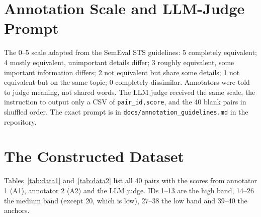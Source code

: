 \documentclass[11pt]{article}
\begin{document}
\begingroup
\makeatletter
\expandafter\def\expandafter\UrlBreaks\expandafter{\UrlBreaks\do\0\do\1\do\2\do\3\do\4\do\5\do\6\do\7\do\8\do\9}
\makeatother

\endgroup

\appendix
\section{Annotation Scale and LLM-Judge Prompt}
\label{sec:appendix}
The 0--5 scale adapted from the SemEval STS guidelines: 5 completely equivalent; 4 mostly equivalent, unimportant details differ; 3 roughly equivalent, some important information differs; 2 not equivalent but share some details; 1 not equivalent but on the same topic; 0 completely dissimilar. Annotators were told to judge meaning, not shared words. The LLM judge received the same scale, the instruction to output only a CSV of \texttt{pair\_id,score}, and the 40 blank pairs in shuffled order. The exact prompt is in \texttt{docs/annotation\_guidelines.md} in the repository.


\section{The Constructed Dataset}
\label{sec:appendixdata}
Tables~\ref{tab:data1} and~\ref{tab:data2} list all 40 pairs with the scores from annotator 1 (A1), annotator 2 (A2) and the LLM judge. IDs 1--13 are the high band, 14--26 the medium band (except 20, which is low), 27--38 the low band and 39--40 the anchors.
\end{document}
